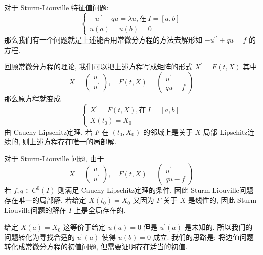 \documentclass[11pt]{ctexart}[UTF8]
\begin{document}
对于 Sturm-Liouville 特征值问题:
\begin{equation*}
    \begin{cases}
        -u^{\prime\prime} + q u = \lambda u, \text{在}\  I=[a,b] \\
        u(a) = u(b) = 0
    \end{cases}
\end{equation*}
那么我们有一个问题就是上述能否用常微分方程的方法去解形如 $-u^{\prime\prime} + q u = f$ 的方程.\par
回顾常微分方程的理论, 我们可以把上述方程写成矩阵的形式 $X^{\prime} = F(t,X)$ 其中
\begin{equation*}
    X = \begin{pmatrix}
        u \\
        u^{\prime}
    \end{pmatrix},\quad F(t,X) = \begin{pmatrix}
        u^{\prime} \\
        q u - f
    \end{pmatrix}
\end{equation*}
那么原方程就变成
\begin{equation*}
    \begin{cases}
        X^{\prime} = F(t,X), \text{在}\  I=[a,b] \\
        X(t_{0}) = X_{0}
    \end{cases}
\end{equation*}
由 Cauchy-Lipschitz定理, 若 $F$ 在 $(t_{0}, X_{0})$ 的邻域上是关于 $X$ 局部 Lipschitz连续的, 则上述方程存在唯一的局部解. \par
对于 Sturm-Liouville 问题, 由于
\begin{equation*}
    X = \begin{pmatrix}
        u \\
        u^{\prime}
    \end{pmatrix},\quad F(t,X) = \begin{pmatrix}
        u^{\prime} \\
        q u - f
    \end{pmatrix}
\end{equation*}
若 $f,q \in C^{0}(I)$ 则满足 Cauchy-Lipschitz定理的条件, 因此 Sturm-Liouville问题存在唯一的局部解. 若给定 $X(t_0) = X_0$ 又因为 $F$
关于 $X$ 是线性的, 因此 Sturm-Liouville问题的解在 $I$ 上是全局存在的.\par
给定 $X(a) = X_{0}$ 这等价于给定 $u(a)=0$ 但是 $u^{\prime}(a)$ 是未知的. 所以我们的问题转化为寻找合适的 $u^{\prime}(a)$ 使得 $u(b) = 0$ 成立.
我们的思路是: 将边值问题转化成常微分方程的初值问题, 但需要证明存在适当的初值.\par
\end{document}
